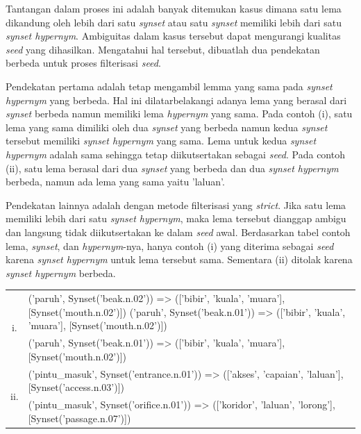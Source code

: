 Tantangan dalam proses ini adalah banyak ditemukan kasus dimana satu lema dikandung oleh lebih dari satu \textit{synset} atau satu \textit{synset} memiliki lebih dari satu \textit{synset hypernym}. Ambiguitas dalam kasus tersebut dapat mengurangi kualitas \textit{seed} yang dihasilkan. Mengatahui hal tersebut, dibuatlah dua pendekatan berbeda untuk proses filterisasi \textit{seed}.

Pendekatan pertama adalah tetap mengambil lemma yang sama pada \textit{synset hypernym} yang berbeda. Hal ini dilatarbelakangi adanya lema yang berasal dari \textit{synset} berbeda namun memiliki lema \textit{hypernym} yang sama. Pada contoh (i), satu lema yang sama dimiliki oleh dua \textit{synset} yang berbeda namun kedua \textit{synset} tersebut memiliki \textit{synset hypernym} yang sama. Lema untuk kedua \textit{synset hypernym} adalah sama sehingga tetap diikutsertakan sebagai \textit{seed}. Pada contoh (ii), satu lema berasal dari dua \textit{synset} yang berbeda dan dua \textit{synset hypernym} berbeda, namun ada lema yang sama yaitu 'laluan'.

Pendekatan lainnya adalah dengan metode filterisasi yang \textit{strict}. Jika satu lema memiliki lebih dari satu \textit{synset hypernym}, maka lema tersebut dianggap ambigu dan langsung tidak diikutsertakan ke dalam \textit{seed} awal. Berdasarkan tabel contoh lema, \textit{synset}, dan \textit{hypernym}-nya, hanya contoh (i) yang diterima sebagai \textit{seed} karena \textit{synset hypernym} untuk lema tersebut sama. Sementara (ii) ditolak karena \textit{synset hypernym} berbeda.

\begin{center}
\begin{tabular}{ |c|m{30em}| } 
\hline
\multirow{2}{*}{i.} & ('paruh', Synset('beak.n.02')) => (['bibir', 'kuala', 'muara'], [Synset('mouth.n.02')])
('paruh', Synset('beak.n.01')) => (['bibir', 'kuala', 'muara'], [Synset('mouth.n.02')]) \\ 
& ('paruh', Synset('beak.n.01')) => (['bibir', 'kuala', 'muara'], [Synset('mouth.n.02')]) \\ 
\hline
\multirow{2}{*}{ii.} & ('pintu\_masuk', Synset('entrance.n.01')) => (['akses', 'capaian', 'laluan'], [Synset('access.n.03')]) \\ 
& ('pintu\_masuk', Synset('orifice.n.01')) => (['koridor', 'laluan', 'lorong'], [Synset('passage.n.07')]) \\ 
\hline
\end{tabular}
\end{center}

